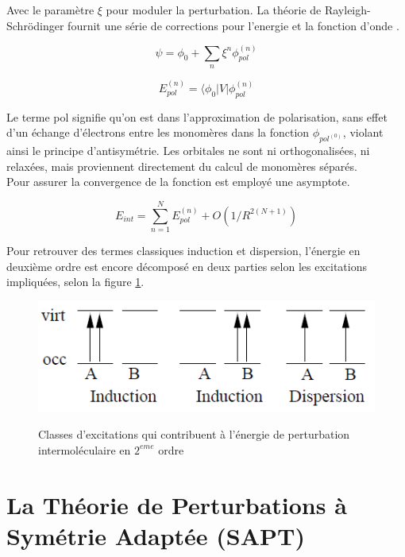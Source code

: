 Avec le paramètre $\xi$ pour moduler la perturbation. La théorie de Rayleigh-Schr\"{o}dinger fournit une série de corrections pour l'energie et la fonction d'onde \cite{chipman1973perturbation}.

\begin{equation}
\psi = \phi_{0} + \sum_{n} \xi^{n} \phi_{pol}^{(n)}
\end{equation}

\begin{equation}
E_{pol}^{(n)} = \langle \phi_{0}|V| \phi_{pol}^{(n)}
\end{equation}

Le terme \og pol \fg{} signifie qu’on est dans l'approximation de polarisation, sans effet d'un échange d’électrons entre les monomères dans la fonction $\phi_{pol^{(0)}}$, violant ainsi le principe d’antisymétrie. Les orbitales ne sont ni orthogonalisées, ni relaxées, mais proviennent directement du calcul de monomères séparés.\\

Pour assurer la convergence de la fonction est employé une asymptote. 

\begin{equation}
E_{int} = \sum_{n=1}^{N} E_{pol}^{(n)} + O(1/R^{2 (N+1)})
\end{equation}

 Pour retrouver des termes classiques induction et dispersion, l'énergie en deuxième ordre est encore décomposé en deux parties selon les excitations impliquées, selon la figure \ref{figExc}.

\singlespacing
\begin{figure}[H]
	\centering
	\includegraphics[scale=0.7]{image/D-I} \label{figExc}
	\caption[Les excitations contribuent à l'énergie
	de perturbation intermoléculaire en $2^{eme}$ ordre]{Classes d'excitations qui contribuent à l'énergie
		de perturbation intermoléculaire en $2^{eme}$ ordre}
\end{figure}



\section{La Théorie de Perturbations à Symétrie Adaptée (SAPT)}



